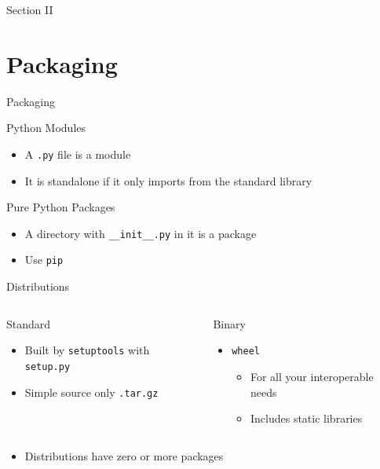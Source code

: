 \documentclass[bigger,unknownkeysallowed,aspectratio=169,red,colorblocks]{beamer}
\begin{document}
\begin{frame}[label={sec:orgdca0415},standout]{Section II}
\section{Packaging}
\begin{center}
  \Huge Packaging
\end{center}
\end{frame}
\begin{frame}[label={sec:org6bf903a},fragile]{Python Modules}
 \begin{itemize}
\item A \texttt{.py} file is a \alert{module}
\item It is \alert{standalone} if it only imports from the standard library
\end{itemize}
\end{frame}
\begin{frame}[label={sec:org56253ba},fragile]{Pure Python Packages}
 \begin{itemize}
\item A directory with \texttt{\_\_init\_\_.py} in it is a \alert{package}
\item Use \texttt{pip}
\end{itemize}
\end{frame}
\begin{frame}[label={sec:orgde819f4},fragile]{Distributions}
 \begin{columns}
\begin{column}{0.45\columnwidth}
\begin{block}{Standard}
\begin{itemize}
\item Built by \texttt{setuptools} with \texttt{setup.py}
\item Simple source only \texttt{.tar.gz}
\end{itemize}
\end{block}
\end{column}
\begin{column}{0.45\columnwidth}
\begin{block}{Binary}
\begin{itemize}
\item \texttt{wheel}
\begin{itemize}
\item For all your interoperable needs
\item Includes static libraries
\end{itemize}
\end{itemize}
\end{block}
\end{column}
\end{columns}
\begin{itemize}
\item Distributions have zero or more packages
\end{itemize}
\end{frame}
\end{document}
